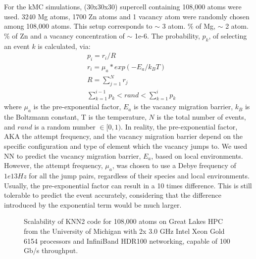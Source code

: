 For the \ac{kMC} simulations, (30x30x30) supercell containing 108,000 atoms were used. 3240 Mg atoms, 1700 Zn atoms and 1 vacancy atom were randomly chosen among 108,000 atoms. This setup corresponds to $\sim$ 3 atom. \% of Mg, $\sim$ 2 atom. \% of Zn and a vacancy concentration of $\sim$ 1e-6. The probability, $p_k$, of selecting an event $k$ is calculated, via:
\begin{subequations}
\begin{align}
& p_i = r_i / R    \label{Chap:Al/Vac:eq:prob} \\
& r_i = \mu_a * exp(- E_a / k_B T)  \label{Chap:Al/Vac:eq:rate} \\
& R = \sum_{j=1}^N r_j \label{Chap:Al/Vac:eq:R} \\
& \sum_{k=1}^{i-1} p_k < rand < \sum_{k=1}^{i} p_k \label{Chap:Al/Vac:eq:choice}
\end{align}
\end{subequations}
where $\mu_a$ is the pre-exponential factor, $E_a$ is the vacancy migration barrier, $k_B$ is the Boltzmann constant, T is the temperature, $N$ is the total number of events, and $rand$ is a random number $\in [0, 1)$. In reality, the pre-exponential factor, AKA the attempt frequency, and the vacancy migration barrier depend on the specific configuration \cite{osti_323431,van2001first,le2002kinetic} and type of element which the vacancy jumps to\cite{clouet2004nucleation}. We used \ac{NN} to predict the vacancy migration barrier, $E_a$, based on local environments. However, the attempt frequency, $\mu_a$, was chosen to use a Debye frequency of $1e13 Hz$ for all the jump pairs, regardless of their species and local environments. Usually, the pre-exponential factor can result in a 10 times difference. This is still tolerable to predict the event accurately, considering that the difference introduced by the exponential term would be much larger.


\begingroup
\begin{figure}[!ht]
  \centering
\caption[Scalability of KNN2 code on Great Lakes HPC.]{Scalability of KNN2 code for 108,000 atoms on Great Lakes HPC from the University of Michigan with 2x 3.0 GHz Intel Xeon Gold 6154 processors and InfiniBand HDR100 networking, capable of 100 Gb/s throughput.}
\label{Chap:Al/Vac:fig:scale}
\end{figure}
\endgroup


